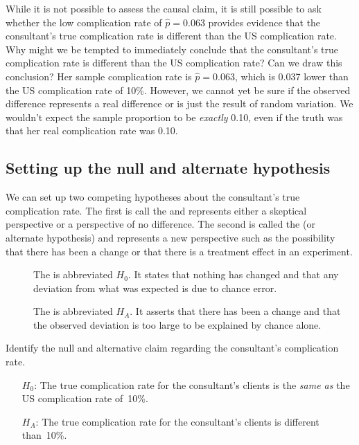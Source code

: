 \begin{example}{While it is not possible to assess the causal claim, it is still possible to ask whether the low complication rate of $\hat{p} = 0.063$ provides evidence that the consultant's true complication rate is different than the US complication rate. Why might we be tempted to immediately conclude that the consultant's true complication rate is different than the US complication rate? Can we draw this conclusion?}
Her sample complication rate is $\hat{p} = 0.063$, which is 0.037 lower than the US complication rate of 10\%. However, we cannot yet be sure if the observed difference represents a real difference or is just the result of random variation. We wouldn't expect the sample proportion to be \emph{exactly} 0.10, even if the truth was that her real complication rate was 0.10.
\end{example}


\subsection{Setting up the null and alternate hypothesis}

We can set up two competing hypotheses about the consultant's true complication rate. The first is call the  and represents either a skeptical perspective or a perspective of no difference. The second is called the  (or alternate hypothesis) and represents a new perspective such as the possibility that there has been a change or that there is a treatment effect in an experiment.

\begin{termBox}{
\vspace{-5mm}
\begin{description}
\item[] The  is abbreviated $H_0$. It states that nothing has changed and that any deviation from what was expected is due to chance error.
\item[] The  is abbreviated $H_A$. It asserts that there has been a change and that the observed deviation is too large to be explained by chance alone.
\end{description}}
\end{termBox}

\begin{example}{Identify the null and alternative claim regarding the consultant's complication rate.}
\begin{itemize}
\item[$H_0$:] The true complication rate for the consultant's clients is the \emph{same as} the US complication rate of~10\%.
\item[$H_A$:] The true complication rate for the consultant's clients is different than~10\%.
\end{itemize}
\end{example}

